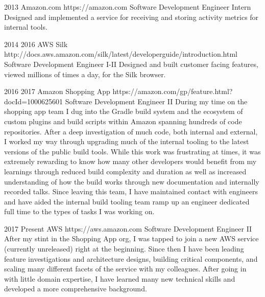 \job
{2013} {}
{Amazon.com} {https://amazon.com}
{Software Development Engineer Intern}
{
    Designed and implemented a service for receiving and storing activity metrics for internal tools.
}

\job
{2014} {2016}
{AWS Silk} {http://docs.aws.amazon.com/silk/latest/developerguide/introduction.html}
{Software Development Engineer I-II}
{
    Designed and built customer facing features, viewed millions of times a day, for the Silk browser.
}

\job
{2016} {2017}
{Amazon Shopping App} {https://amazon.com/gp/feature.html?docId=1000625601}
{Software Development Engineer II}
{
    During my time on the shopping app team I dug into the Gradle build system and the ecosystem of custom plugins and build scripts within Amazon spanning hundreds of code repositories. After a deep investigation of much code, both internal and external, I worked my way through upgrading much of the internal tooling to the latest versions of the public build tools. While this work was frustrating at times, it was extremely rewarding to know how many other developers would benefit from my learnings through reduced build complexity and duration as well as increased understanding of how the build works through new documentation and internally recorded talks. Since leaving this team, I have maintained contact with engineers and have aided the internal build tooling team ramp up an engineer dedicated full time to the types of tasks I was working on.
}

\job
{2017} {Present}
{AWS} {https://aws.amazon.com}
{Software Development Engineer II}
{
    After my stint in the Shopping App org, I was tapped to join a new AWS service (currently unreleased) right at the beginning. Since then I have been leading feature investigations and architecture designs, building critical components, and scaling many different facets of the service with my colleagues. After going in with little domain expertise, I have learned many new technical skills and developed a more comprehensive background.
}